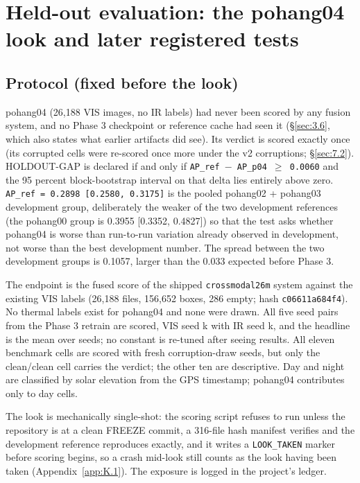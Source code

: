 \documentclass[10pt]{article}
\begin{document}
\section{Held-out evaluation: the pohang04 look and later registered tests}\label{sec:7}
\subsection{Protocol (fixed before the look)}\label{sec:7.1}
pohang04 (26,188 VIS images, no IR labels) had never been scored by any fusion system, and no Phase 3 checkpoint or reference cache had seen it (\S\ref{sec:3.6}, which also states what earlier artifacts did see). Its verdict is scored exactly once (its corrupted cells were re-scored once more under the v2 corruptions; \S\ref{sec:7.2}). HOLDOUT-GAP is declared if and only if \texttt{AP\_\allowbreak{}ref $-$ AP\_\allowbreak{}p04 $\geq$ 0.0060} and the 95 percent block-bootstrap interval on that delta lies entirely above zero. \texttt{AP\_\allowbreak{}ref = 0.2898 [0.2580, 0.3175]} is the pooled pohang02 + pohang03 development group, deliberately the weaker of the two development references (the pohang00 group is 0.3955 [0.3352, 0.4827]) so that the test asks whether pohang04 is worse than run-to-run variation already observed in development, not worse than the best development number. The spread between the two development groups is 0.1057, larger than the 0.033 expected before Phase 3.

The endpoint is the fused score of the shipped \texttt{crossmodal26m} system against the existing VIS labels (26,188 files, 156,652 boxes, 286 empty; hash \texttt{c06611a684f4}). No thermal labels exist for pohang04 and none were drawn. All five seed pairs from the Phase 3 retrain are scored, VIS seed k with IR seed k, and the headline is the mean over seeds; no constant is re-tuned after seeing results. All eleven benchmark cells are scored with fresh corruption-draw seeds, but only the clean/clean cell carries the verdict; the other ten are descriptive. Day and night are classified by solar elevation from the GPS timestamp; pohang04 contributes only to day cells.

The look is mechanically single-shot: the scoring script refuses to run unless the repository is at a clean FREEZE commit, a 316-file hash manifest verifies and the development reference reproduces exactly, and it writes a \texttt{LOOK\_\allowbreak{}TAKEN} marker before scoring begins, so a crash mid-look still counts as the look having been taken (Appendix~\ref{app:K.1}). The exposure is logged in the project's ledger.
\end{document}
